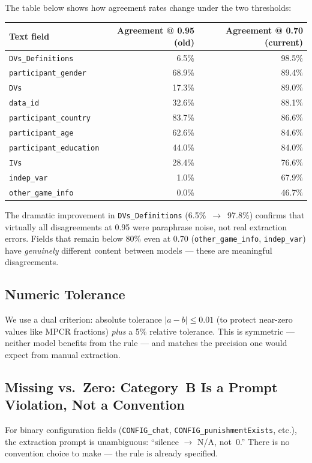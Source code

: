 \documentclass[11pt,a4paper]{article}
\begin{document}
        The table below shows how agreement rates change under the two thresholds:

        \begin{center}\small
\begin{tabular}{lrr}
\toprule
\textbf{Text field} & \textbf{Agreement @ 0.95 (old)} & \textbf{Agreement @ 0.70 (current)} \\
\midrule
\texttt{DVs\_Definitions} & 6.5\% & 98.5\% \\
\texttt{participant\_gender} & 68.9\% & 89.4\% \\
\texttt{DVs} & 17.3\% & 89.0\% \\
\texttt{data\_id} & 32.6\% & 88.1\% \\
\texttt{participant\_country} & 83.7\% & 86.6\% \\
\texttt{participant\_age} & 62.6\% & 84.6\% \\
\texttt{participant\_education} & 44.0\% & 84.0\% \\
\texttt{IVs} & 28.4\% & 76.6\% \\
\texttt{indep\_var} & 1.0\% & 67.9\% \\
\texttt{other\_game\_info} & 0.0\% & 46.7\% \\
\bottomrule
\end{tabular}
\end{center}

        \medskip
        The dramatic improvement in \texttt{DVs\_Definitions} (6.5\%~$\rightarrow$~97.8\%)
        confirms that virtually all disagreements at 0.95 were paraphrase noise, not
        real extraction errors.  Fields that remain below 80\% even at 0.70
        (\texttt{other\_game\_info}, \texttt{indep\_var}) have \emph{genuinely}
        different content between models --- these are meaningful disagreements.

        \subsection{Numeric Tolerance}
        We use a dual criterion: absolute tolerance $|a-b| \leq 0.01$ (to protect
        near-zero values like MPCR fractions) \emph{plus} a 5\% relative tolerance.
        This is symmetric --- neither model benefits from the rule --- and matches the
        precision one would expect from manual extraction.

        \subsection{Missing vs.\ Zero: Category~B Is a Prompt Violation, Not a Convention}
        For binary configuration fields (\texttt{CONFIG\_chat}, \texttt{CONFIG\_punishmentExists},
        etc.), the extraction prompt is unambiguous: ``silence $\rightarrow$ N/A, not~0.''
        There is no convention choice to make --- the rule is already specified.
\end{document}
